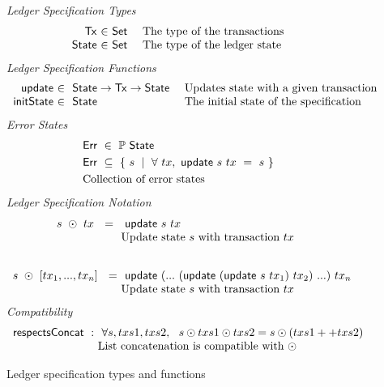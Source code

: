 \begin{figure*}[htb]
  \emph{Ledger Specification Types}
  \begin{equation*}
    \begin{array}{r@{~\in~}l@{~~~~}lr}
      \Tx
      & \Set
      & \text{The type of the transactions} \\
      \State
      & \Set
      & \text{The type of the ledger state} \\
    \end{array}
  \end{equation*}
  \emph{Ledger Specification Functions}
  \begin{equation*}
    \begin{array}{r@{~\in~}l@{~~~~}lr}
    \ups & ~\type{State} \to \type{Tx} \to \type{State}
    & \text{Updates state with a given transaction} \\
    \fun{initState} & ~\type{State}
    & \text{The initial state of the specification} \\
    \end{array}
  \end{equation*}
  \emph{Error States}
  \begin{align*}
    & \mathsf{Err} ~\in~ \mathbb{P}~\mathsf{State} \\
    & \mathsf{Err} ~\subseteq~ \{~s~\mid~\forall~tx,~\mathsf{update}~s~tx~=~s~\} \\
    & \text{Collection of error states} \\
  \end{align*}
  \emph{Ledger Specification Notation}
  \begin{equation*}
    \begin{array}{r@{~}l@{~~~~}lr}
    s~\odot~tx~ ~=~&~ \ups~s~tx  \\
    & \text{Update state $s$ with transaction $tx$} \\
    \nextdef
    s~\odot~[tx_1, ... , tx_n]~~= &~ \ups~(...~ (\ups~(\ups~s~tx_1)~tx_2) ~...)~ tx_n \\
    & \text{Update state $s$ with transaction $tx$} \\
    \end{array}
  \end{equation*}
  \emph{Compatibility}
  \begin{equation*}
    \begin{array}{r@{}l@{~~~~}lr}
    \fun{respectsConcat}~:~&~ \forall s, txs1, txs2,~~s \odot txs1 \odot txs2 = s \odot (txs1 ++ txs2)  \\
    & \text{List concatenation is compatible with $\odot$} \\
    \end{array}
  \end{equation*}
  \caption{Ledger specification types and functions}
  \label{fig:ledger-spec}
\end{figure*}

